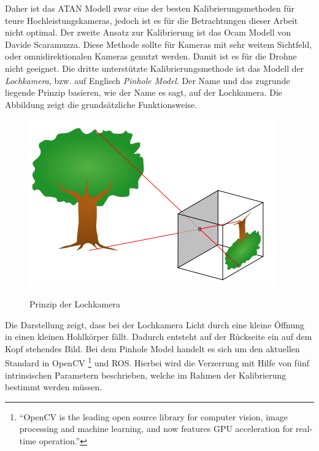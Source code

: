 Daher ist das ATAN Modell zwar eine der besten Kalibrierungsmethoden für teure Hochleistungskameras, jedoch ist es für die Betrachtungen dieser Arbeit nicht optimal. \newline
Der zweite Ansatz zur Kalibrierung ist das Ocam Modell von Davide Scaramuzza. Diese Methode sollte für Kameras mit sehr weitem Sichtfeld, oder omnidirektionalen Kameras genutzt werden. Damit ist es für die Drohne nicht geeignet. \newline
Die dritte unterstützte Kalibrierungsmethode ist das Modell der \textit{Lochkamera}, bzw. auf Englisch \textit{Pinhole Model}.
Der Name und das zugrunde liegende Prinzip basieren, wie der Name es sagt, auf der Lochkamera. Die Abbildung zeigt die grundsätzliche Funktionsweise. \newline
\begin{figure}[ht]
	\centering
	\includegraphics[scale=0.5]{Bilder/pinhole.png}
	\label{fig:pinhole}
	\caption{Prinzip der Lochkamera \cite{lochkamera}}
\end{figure}

Die Darstellung zeigt, dass bei der Lochkamera Licht durch eine kleine Öffnung in einen kleinen Hohlkörper fällt. Dadurch entsteht auf der Rückseite ein auf dem Kopf stehendes Bild. \newline
Bei dem Pinhole Model handelt es sich um den aktuellen Standard in OpenCV \footnote{``OpenCV is the leading open source library for computer vision, image processing and machine learning, and now features GPU acceleration for real-time operation.''} %
und ROS. Hierbei wird die Verzerrung mit Hilfe von fünf intrinsischen Parametern beschrieben, welche im Rahmen der Kalibrierung bestimmt werden müssen.

